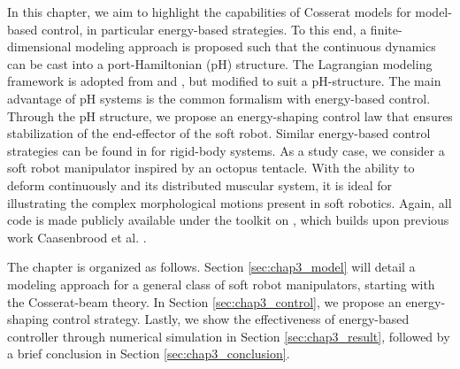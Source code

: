 In this chapter, we aim to highlight the capabilities of Cosserat models for model-based control, in particular energy-based strategies. To this end, a finite-dimensional modeling approach is proposed such that the continuous dynamics can be cast into a port-Hamiltonian (pH) structure. The Lagrangian modeling framework is adopted from \cite{Boyer2021} and \cite{Renda2020}, but modified to suit a pH-structure. The main advantage of pH systems is the common formalism with energy-based control. Through the pH structure, we propose an energy-shaping control law that ensures stabilization of the end-effector of the soft robot. Similar energy-based control strategies can be found in \cite{Franco2020,Schaft2004,Ortega2002,Ortega1998} for rigid-body systems. As a study case, we consider a soft robot manipulator inspired by an octopus tentacle. With the ability to deform continuously and its distributed muscular system, it is ideal for illustrating the complex morphological motions present in soft robotics. Again, all code is made publicly available under the \sorotoki toolkit on \cite{SorotokiCode}, which builds upon previous work Caasenbrood et al. \cite{Caasenbrood2021}.

The chapter is organized as follows. Section \ref{sec:chap3_model} will detail a modeling approach for a general class of soft robot manipulators, starting with the Cosserat-beam theory. In Section \ref{sec:chap3_control}, we propose an energy-shaping control strategy. Lastly, we show the effectiveness of energy-based controller through numerical simulation in Section  \ref{sec:chap3_result}, followed by a brief conclusion in Section  \ref{sec:chap3_conclusion}.
